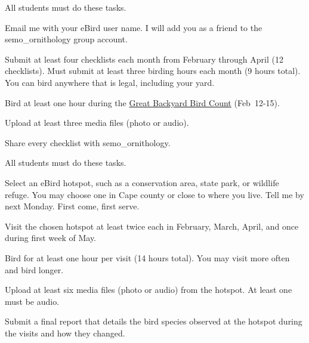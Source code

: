 \documentclass[t]{beamer}
\begin{document}
{
\begin{frame}{All students must do these tasks.}

\vspace{-\baselineskip}

\hangpara Email me with your eBird user name. I will add you as a friend to the semo\_ornithology group account.

\hangpara Submit at least four checklists each month from February through April (12 checklists). Must submit at least three birding hours each month (9 hours total). You can bird anywhere that is legal, including your yard.

\hangpara Bird at least one hour during the \href{https://www.birdcount.org/}{Great Backyard Bird Count} (Feb~12-15).

\hangpara Upload at least three media files (photo or audio).

\hangpara Share every checklist with semo\_ornithology.

\hangpara \href{https://support.ebird.org/en/support/solutions/articles/48000795623-ebird-rules-and-best-practices}{}

\end{frame}
}

{
\begin{frame}{All  students must do these tasks.}

\vspace{-\baselineskip}

\hangpara Select an eBird hotspot, such as a conservation area, state park, or wildlife refuge. You may choose one in Cape county or close to where you live. Tell me by next Monday. First come, first serve.

\hangpara Visit the chosen hotspot at least twice each in February, March, April, and once during first week of May.

\hangpara Bird for at least one hour per visit (14 hours total). You may visit more often and bird longer. 


\hangpara Upload at least six media files (photo or audio) from the hotspot. At least one must be audio.

\hangpara Submit a final report that details the bird species observed at the hotspot during the visits and how they changed. 

\end{frame}
}
\end{document}
